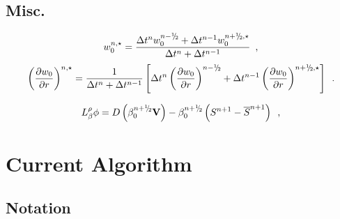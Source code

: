 \documentclass[11pt]{article}
\newcommand{\sfrac}[2]{\mathchoice
  {\kern0em\raise.5ex\hbox{\the\scriptfont0 #1}\kern-.15em/
   \kern-.15em\lower.25ex\hbox{\the\scriptfont0 #2}}
  {\kern0em\raise.5ex\hbox{\the\scriptfont0 #1}\kern-.15em/
   \kern-.15em\lower.25ex\hbox{\the\scriptfont0 #2}}
  {\kern0em\raise.5ex\hbox{\the\scriptscriptfont0 #1}\kern-.2em/
   \kern-.15em\lower.25ex\hbox{\the\scriptscriptfont0 #2}}
  {#1\!/#2}}
\newcommand{\myhalf}{\sfrac{1}{2}}
\newcommand{\nph}{{n + \myhalf}}
\newcommand{\nmh}{{n - \myhalf}}
\newcommand{\dt}{\Delta t}
\begin{document}
\subsection{Misc.}

\begin{equation}
w_0^{n,\star} = \frac{\dt^{n} w_0^{\nmh} + \dt^{n-1} w_0^{\nph,\star}}{\dt^n+\dt^{n-1}}\enskip,\label{eq:w0nstar}
\end{equation}
\begin{equation}
\left(\frac{\partial w_0}{\partial r}\right)^{n,\star} = \frac{1}{\dt^n+\dt^{n-1} } \left [ \dt^{n} \left(\frac{\partial w_0 }{ \partial r}\right)^{\nmh}
+ \dt^{n-1} \left(\frac{\partial w_0 }{ \partial r}\right)^{\nph,\star} \right ] \enskip.\label{eq:dw0drnstar}
\end{equation}

\begin{equation}
 L_\beta^\rho \phi =
   D \left ( \beta_0^{\nph} {\bf V} \right) - \beta_0^{\nph} \left(S^{n+1}-\overline{S}^{n+1} \right)\enskip,
\label{eq:nodal_solve}
\end{equation}

\section{Current Algorithm}
\subsection{Notation}
\end{document}
